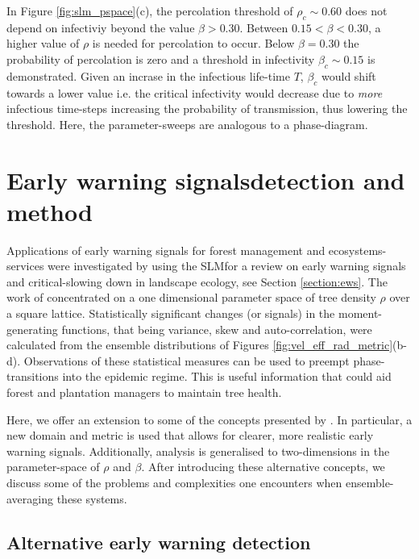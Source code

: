 In Figure \ref{fig:slm_pspace}(c), the percolation threshold of $\rho_c \sim 0.60$ does not depend on infectiviy beyond the value $\beta>0.30$. %
Between $0.15 <\beta<0.30$, a higher value of $\rho$ is needed for percolation to occur. %
Below $\beta=0.30$ the probability of percolation is zero and a threshold in infectivity $\beta_c \sim 0.15$ is demonstrated. %
Given an incrase in the infectious life-time $T$, $\beta_c$ would shift towards a lower value %
 i.e. the critical infectivity would decrease due to \textit{more} infectious time-steps %
 increasing the probability of transmission, thus lowering the threshold. %
 Here, the parameter-sweeps are analogous to a phase-diagram. %

\section{Early warning signals\textemdash detection and method}

Applications of early warning signals for forest management and ecosystems-services were %
investigated by \cite{OROZCOFUENTES201912} using the SLM\textemdash for a review on early %
warning signals and critical-slowing down in landscape ecology, see Section \ref{section:ews}. %
The work of \cite{OROZCOFUENTES201912} concentrated on a one dimensional parameter space of %
tree density $\rho$ over a square lattice. %
Statistically significant changes (or signals) in the moment-generating functions, %
that being variance, skew and auto-correlation, were calculated from the ensemble distributions of Figures \ref{fig:vel_eff_rad_metric}(b-d). %
Observations of these statistical measures can be used to preempt phase-transitions into the epidemic regime. %
This is useful information that could aid forest and plantation managers to maintain tree health. %

Here, we offer an extension to some of the concepts presented by \cite{OROZCOFUENTES201912}. %
In particular, a new domain and metric is used that allows for clearer, more realistic early warning signals.  %
Additionally, analysis is generalised to two-dimensions in the parameter-space of $\rho$ and $\beta$. %
After introducing these alternative concepts, we discuss some of the problems and complexities one encounters %
when ensemble-averaging these systems. %

\subsection{Alternative early warning detection}

